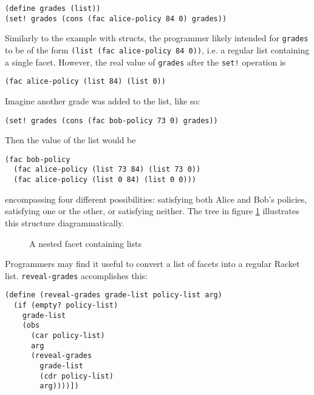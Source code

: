 \documentclass{article}
\begin{document}
\begin{lstlisting}
(define grades (list))
(set! grades (cons (fac alice-policy 84 0) grades))
\end{lstlisting}

Similarly to the example with structs, the programmer likely intended for \texttt{grades} to be of the form \texttt{(list (fac alice-policy 84 0))}, i.e. a regular list containing a single facet. However, the real value of \texttt{grades} after the \texttt{set!} operation is

\begin{lstlisting}
(fac alice-policy (list 84) (list 0))
\end{lstlisting}

Imagine another grade was added to the list, like so:

\begin{lstlisting}
(set! grades (cons (fac bob-policy 73 0) grades))
\end{lstlisting}

Then the value of the list would be

\begin{lstlisting}
(fac bob-policy
  (fac alice-policy (list 73 84) (list 73 0))
  (fac alice-policy (list 0 84) (list 0 0)))
\end{lstlisting}

\noindent encompassing four different possibilities: satisfying both Alice and Bob's policies, satisfying one or the other, or satisfying neither. The tree in figure \ref{figure:nested-list} illustrates this structure diagrammatically.

\begin{figure}[h]
\begin{center}
	\caption{A nested facet containing lists}
	\label{figure:nested-list}
\end{center}
\end{figure}

Programmers may find it useful to convert a list of facets into a regular Racket list. \texttt{reveal-grades} accomplishes this:

\begin{lstlisting}
(define (reveal-grades grade-list policy-list arg)
  (if (empty? policy-list)
    grade-list
    (obs
      (car policy-list)
      arg
      (reveal-grades
        grade-list
        (cdr policy-list)
        arg))))])
\end{lstlisting}
\end{document}
